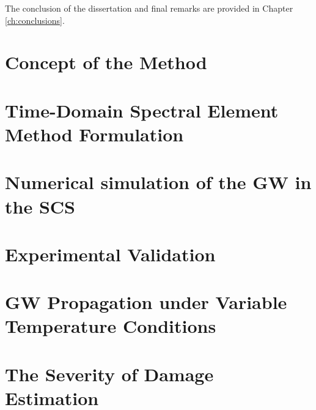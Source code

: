 \documentclass[11pt,a4paper,final]{report}
\begin{document}
The conclusion of the dissertation and final remarks are provided in Chapter \ref{ch:conclusions}.

\clearpage{}
\clearpage{}

\chapter[Concept of the Method]{Concept of the Method}
\label{ch:method}








\clearpage{}
\clearpage{}

\chapter[Time-Domain Spectral Element Method Formulation]{Time-Domain Spectral Element Method Formulation}
\label{ch:sem}





\clearpage{}
\clearpage{}

\chapter[Numerical simulation of the GW in the SCS]{Numerical simulation of the GW in the SCS}
\label{ch:simulation}





\clearpage{}
\clearpage{}

\chapter[Experimental Validation]{Experimental Validation}
\label{ch:validation}






%
\clearpage{}
\clearpage{}

\chapter[GW Propagation under Variable Temperature Conditions]{GW Propagation under Variable Temperature Conditions}
\label{ch:tempEffects}






%
\clearpage{}
\clearpage{}

\chapter[The Severity of Damage Estimation]{The Severity of Damage Estimation}
\label{ch:severity}
\end{document}
